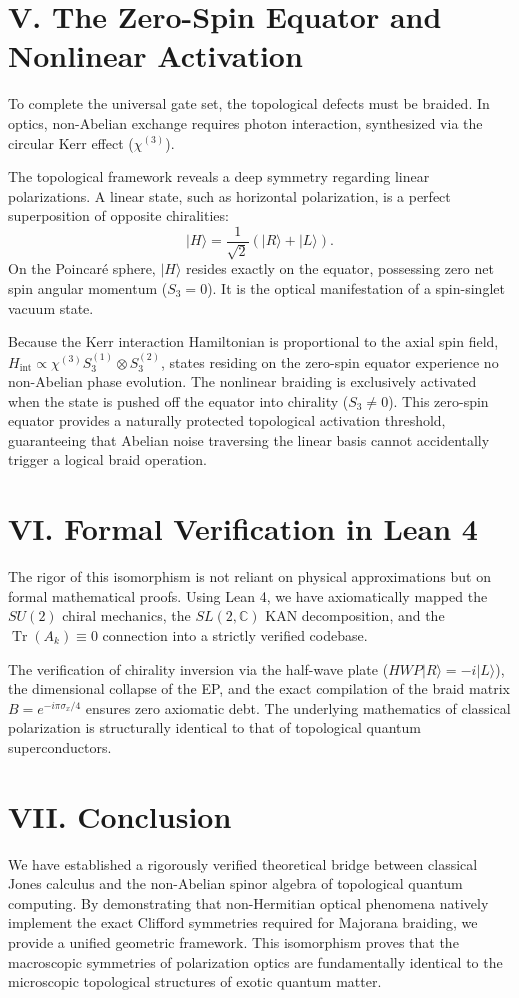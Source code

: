 \documentclass[aps,prx,twocolumn,superscriptaddress,amsmath,amssymb]{revtex4-2}
\begin{document}
\section{V. The Zero-Spin Equator and Nonlinear Activation}
To complete the universal gate set, the topological defects must be braided. In optics, non-Abelian exchange requires photon interaction, synthesized via the circular Kerr effect ($\chi^{(3)}$).

The topological framework reveals a deep symmetry regarding linear polarizations. A linear state, such as horizontal polarization, is a perfect superposition of opposite chiralities:
\begin{equation}
|H\rangle = \frac{1}{\sqrt{2}}(|R\rangle + |L\rangle).
\end{equation}
On the Poincaré sphere, $|H\rangle$ resides exactly on the equator, possessing zero net spin angular momentum ($S_3 = 0$). It is the optical manifestation of a spin-singlet vacuum state.

Because the Kerr interaction Hamiltonian is proportional to the axial spin field, $H_{\mathrm{int}} \propto \chi^{(3)} S_3^{(1)} \otimes S_3^{(2)}$, states residing on the zero-spin equator experience no non-Abelian phase evolution. The nonlinear braiding is exclusively activated when the state is pushed off the equator into chirality ($S_3 \neq 0$). This zero-spin equator provides a naturally protected topological activation threshold, guaranteeing that Abelian noise traversing the linear basis cannot accidentally trigger a logical braid operation.

\section{VI. Formal Verification in Lean 4}
The rigor of this isomorphism is not reliant on physical approximations but on formal mathematical proofs. Using Lean 4, we have axiomatically mapped the $SU(2)$ chiral mechanics, the $SL(2, \mathbb{C})$ KAN decomposition, and the $\operatorname{Tr}(A_k) \equiv 0$ connection into a strictly verified codebase. 

The verification of chirality inversion via the half-wave plate ($HWP |R\rangle = -i|L\rangle$), the dimensional collapse of the EP, and the exact compilation of the braid matrix $B = e^{-i\pi\sigma_x/4}$ ensures zero axiomatic debt. The underlying mathematics of classical polarization is structurally identical to that of topological quantum superconductors.

\section{VII. Conclusion}
We have established a rigorously verified theoretical bridge between classical Jones calculus and the non-Abelian spinor algebra of topological quantum computing. By demonstrating that non-Hermitian optical phenomena natively implement the exact Clifford symmetries required for Majorana braiding, we provide a unified geometric framework. This isomorphism proves that the macroscopic symmetries of polarization optics are fundamentally identical to the microscopic topological structures of exotic quantum matter.
\end{document}
